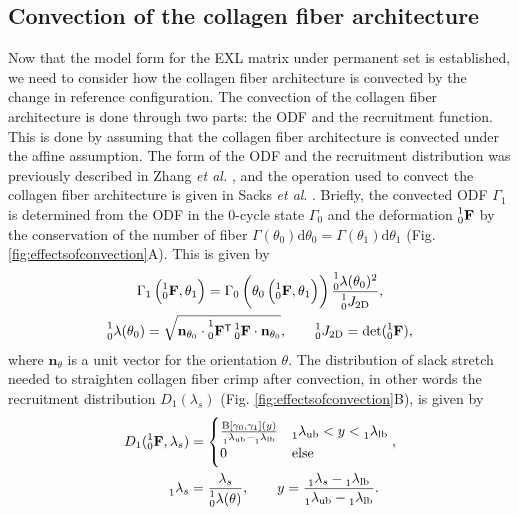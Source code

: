 \subsection{Convection of the collagen fiber architecture} \label{sec:convection}

    Now that the model form for the EXL matrix under permanent set is established, we need to consider how the collagen fiber architecture is convected by the change in reference configuration. The convection of the collagen fiber architecture is done through two parts: the ODF and the recruitment function. This is done by assuming that the collagen fiber architecture is convected under the affine assumption\cite{lee_presence_2015}. The form of the ODF and the recruitment distribution was previously described in Zhang \textit{et al.} \cite{zhang_meso_2016}, and the operation used to convect the collagen fiber architecture is given in Sacks \textit{et al}. \cite{sacks_novel_2015}. Briefly, the convected ODF $\Gamma_1$ is determined from the ODF in the 0-cycle state $\Gamma_0$ and the deformation $\prescript{1}{0}{\mathbf{F}}$ by the conservation of the number of fiber $\Gamma(\theta_0) \mathrm{d}\theta_0 = \Gamma(\theta_1) \mathrm{d}\theta_1$ (Fig. \ref{fig:effectsofconvection}A). This is given by
\begin{equation} \label{eq:pfODF}
\begin{gathered}
\Gamma_1\left( \prescript{1}{0}{\mathbf{F}},\theta_1 \right) = \Gamma_0\left( \theta_0\left( \prescript{1}{0}{\mathbf{F}},\theta_1\right)\right)\frac{\prescript{1}{0}{\lambda(\theta_0)}^2}{\prescript{1}{0}{J_\mathrm{2D}}}, \\
\prescript{1}{0}{\lambda(\theta_0)} = \sqrt{\mathbf{n}_{\theta_0}\cdot  \prescript{1}{0}{\mathbf{F}^\mathsf{T}}  \prescript{1}{0}{\mathbf{F}} \cdot \mathbf{n}_{\theta_0}}, \qquad \prescript{1}{0}{J_\mathrm{2D}} =\det (\prescript{1}{0}{\mathbf{F}}),
\end{gathered}
\end{equation}
    where $\mathbf{n}_\theta$ is a unit vector for the orientation $\theta$. The distribution of slack stretch needed to straighten collagen fiber crimp after convection, in other words the recruitment distribution $D_1(\lambda_s)$ (Fig. \ref{fig:effectsofconvection}B), is given by
\begin{equation} \label{eq:pfrecruitment}
\begin{gathered}
D_1(\prescript{1}{0}{\mathbf{F}}, \lambda_s) = \begin{cases} \frac{\operatorname{B}[\gamma_0,\gamma_1](y)}{\prescript{}{1}{\lambda}_\mathrm{ub}-\prescript{}{1}{\lambda}_\mathrm{lb}} & \prescript{}{1}{\lambda}_\mathrm{ub} < y < \prescript{}{1}{\lambda}_\mathrm{lb} \\ 0 & \text{else}\end{cases}, \\
\qquad \prescript{}{1}{\lambda}_s = \frac{\lambda_s}{\prescript{1}{0}{\lambda}(\theta)}, \qquad y = \frac{\prescript{}{1}{\lambda}_s - \prescript{}{1}{\lambda}_\mathrm{lb}}{\prescript{}{1}{\lambda}_\mathrm{ub}-\prescript{}{1}{\lambda}_\mathrm{lb}}.
\end{gathered}
\end{equation}
